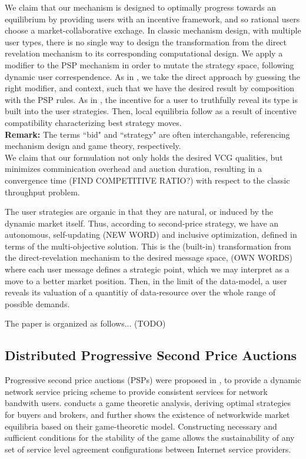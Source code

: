 \documentclass[sigconf, anonymous]{acmart}
\theoremstyle{definition}
\begin{document}
We claim that our mechanism is designed to optimally progress towards an
equilibrium by providing users with an incentive framework, and so rational
users choose a market-collaborative exchage. 
In classic mechanism design, with multiple user types, there is no single
way to design the transformation from the direct revelation mechanism to its
corresponding computational design. We apply a modifier to the PSP mechanism in
order to mutate the strategy space, following dynamic user
correspendence. As in \cite{lazar}, we take the direct
approach by guessing the right modifier, and context, such that we have the
desired result by composition with the PSP rules. 
As in \cite{lazar}, the incentive for a
user to truthfully reveal its type is built into the user strategies. Then,
local equilibria follow as a result of incentive
compatibility characterizing best strategy moves. \\ 
\textbf{Remark:} The terms ``bid" and ``strategy" are often interchangable,
referencing mechanism design and game theory, respectively.\\
We claim that our formulation not only holds the desired VCG qualities,
but minimizes comminication overhead 
and auction duration, resulting in a convergence time (FIND COMPETITIVE RATIO?)
with respect to the classic throughput problem. 

The user strategies are organic in that they are natural, or
induced by the dynamic market itself. Thus, according to second-price strategy,
we have an autonomous, self-updating (NEW WORD) and inclusive optimization, defined in terms of the multi-objective solution.
This is the (built-in) transformation from the
direct-revelation mechanism to the desired message space, (OWN WORDS) where each user
message defines a strategic point, which we may interpret as a move to a better
market position. Then, in the limit of the data-model, a user reveals its
valuation of a quantitiy of data-resource over the whole range of possible demands.

The paper is organized as follows... (TODO)

\subsection{Distributed Progressive Second Price Auctions}

Progressive second price auctions (PSPs) were proposed
in \cite{lazar}, \cite{diffserve} to provide a dynamic network service pricing
scheme to provide consistent services for network bandwith users.
\cite{diffserve} conducts a game theoretic analysis, deriving
optimal strategies for buyers and brokers, and further shows the existence
of networkwide market equilibria based on their game-theoretic
model. Constructing necessary and sufficient conditions for the stability
of the game allows the sustainability of any set
of service level agreement configurations between Internet service
providers.
\end{document}

